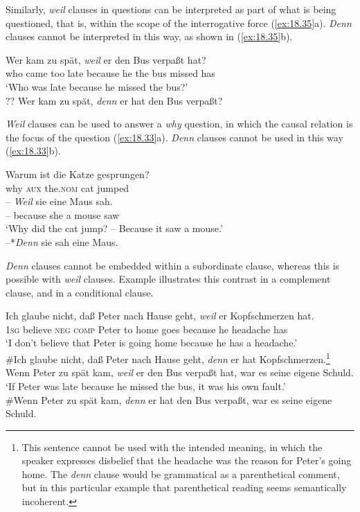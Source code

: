 Similarly, \textit{weil} clauses in questions can be interpreted as part of what is being questioned, that is, within the scope of the interrogative force (\ref{ex:18.35}a). \textit{Denn} clauses cannot be interpreted in this way, as shown in (\ref{ex:18.35}b).


\ea \label{ex:18.35}
\ea \gll  Wer kam zu spät, \textit{weil} er den Bus verpaßt hat?\\
who  came  too  late  because  he the bus missed has \\
\glt ‘Who was late because he missed the bus?’ \\
\ex ?? Wer kam zu spät, \textit{denn} er hat den Bus verpaßt?
                       \z
\z


\textit{Weil} clauses can be used to answer a \textit{why} question, in which the causal relation is the focus of the question (\ref{ex:18.33}a). \textit{Denn} clauses cannot be used in this way (\ref{ex:18.33}b).


\ea \label{ex:18.33}
\ea  \gll Warum  ist  die  Katze  gesprungen? \\
why  \textsc{aux}  the.\textsc{nom}  cat  jumped \\
\newline
\gll – \textit{Weil}  sie  eine  Maus  sah. \\
 –  because  she  a  mouse  saw\\
\glt ‘Why did the cat jump? – Because it saw a mouse.’ \\
\ex  –*\textit{Denn} sie sah eine Maus.
\z \z



\textit{Denn} clauses cannot be embedded within a subordinate clause, whereas this is possible with \textit{weil} clauses. Example  illustrates this contrast in a complement clause, and  in a conditional clause.


\ea \label{ex:18.36}
\ea   \gll Ich  glaube  nicht,  daß  Peter  nach  Hause  geht,  \textit{weil}  er  Kopfschmerzen  hat.\\
\textsc{1sg}  believe  \textsc{neg}  \textsc{comp}  Peter  to  home  goes  because  he  headache  has\\
\glt ‘I don’t believe that Peter is going home because he has a headache.’ \\
\ex  \#Ich glaube nicht, daß Peter nach Hause geht, \textit{denn} er hat Kopfschmerzen.\footnote{This sentence cannot be used with the intended meaning, in which the speaker expresses disbelief that the headache was the reason for Peter’s going home. The \textit{denn} clause would be grammatical as a parenthetical comment, but in this particular example that parenthetical reading seems semantically incoherent.}
\z 
\ex\label{ex:18.37}
\ea  Wenn Peter zu spät kam, \textit{weil} er den Bus verpaßt hat, war es seine eigene Schuld.\\
\glt ‘If Peter was late because he missed the bus, it was his own fault.’ \\
\ex \#Wenn Peter zu spät kam, \textit{denn} er hat den Bus verpaßt, war es seine eigene Schuld.
\z \z


